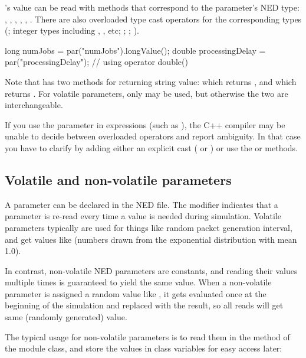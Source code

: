 's value can be read with methods that correspond to
the parameter's NED type: , ,
, , ,
.
There are also overloaded type cast operators for the corresponding types
(; integer types including , , etc;
; ; ).

\begin{cpp}
long numJobs = par("numJobs").longValue();
double processingDelay = par("processingDelay"); // using operator double()
\end{cpp}

Note that  has two methods for returning string value:
 which returns , and
 which returns .
For volatile parameters, only  may be used,
but otherwise the two are interchangeable.

If you use the  parameter in expressions (such as
), the C++ compiler may be unable to decide
between overloaded operators and report ambiguity. In that case
you have to clarify by adding either an explicit cast
( or ) or use
the  or  methods.


\subsection{Volatile and non-volatile parameters}
\label{sec:simple-modules:volatile-parameters}

A parameter can be declared  in the NED file. The 
modifier indicates that a parameter is re-read every time a value is needed
during simulation. Volatile parameters typically are used for things like
random packet generation interval, and get values like 
(numbers drawn from the exponential distribution with mean 1.0).

In contrast, non-volatile NED parameters are constants, and reading their
values multiple times is guaranteed to yield the same value. When a non-volatile
parameter is assigned a random value like , it gets
evaluated once at the beginning of the simulation and replaced with the result,
so all reads will get same (randomly generated) value.

The typical usage for non-volatile parameters is to read them in the
 method of the module class, and store the values
in class variables for easy access later:

